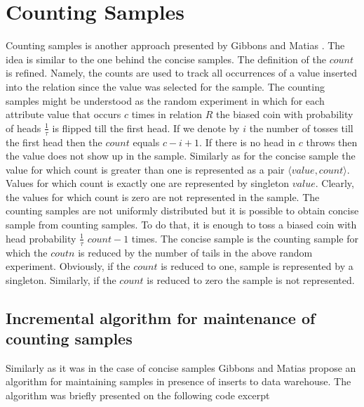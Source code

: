 \section{Counting Samples}
Counting samples is another approach presented by Gibbons and Matias
\cite{GM98}. The idea is similar to the one behind the concise
samples. The definition of the $count$ is refined. Namely, the counts
are used to track all occurrences of a value inserted into the
relation since the value was selected for the sample. The counting
samples might be understood as the random experiment in which for each
attribute value that occurs $c$ times in relation $R$ the biased coin
with probability of heads $\frac{1}{\tau}$ is flipped till the first
head. If we denote by $i$ the number of tosses till the first head
then the $count$ equals $c - i + 1$. If there is no head in $c$ throws
then the value does not show up in the sample. Similarly as for the
concise sample the value for which count is greater than one is
represented as a pair $\langle value, count \rangle$. Values for
which count is exactly one are represented by singleton
$value$. Clearly, the values for which count is zero are not
represented in the sample. The counting samples are not uniformly
distributed but it is possible to obtain concise sample from counting
samples. To do that, it is enough to toss a biased coin with head
probability $\frac{1}{\tau}$ $count - 1$ times. The concise sample is
the counting sample for which the $coutn$ is reduced by the number of
tails in the above random experiment. Obviously, if the $count$ is
reduced to one, sample is represented by a singleton. Similarly, if the
$count$ is reduced to zero the sample is not represented.

\subsection{Incremental algorithm for maintenance of counting samples}
Similarly as it was in the  case of concise samples Gibbons and Matias
propose an algorithm for maintaining samples in presence of inserts to
data warehouse. The algorithm was briefly presented on the following
code excerpt

